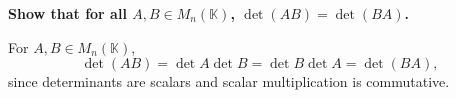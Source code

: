 \providecommand{\rank}{\operatorname{r}}
\providecommand{\RR}{\mathbb R}
\providecommand{\CC}{\mathbb C}
\providecommand{\KK}{\mathbb K}

\setcounter{enumi}{51}
\item {\bfseries\boldmath
Show that for all $A,B\in M_n(\KK)$, $\det(AB)=\det(BA)$.
}

\begin{answer}
For $A,B\in M_n(\KK)$,
\[
 \det(AB)=\det A\det B=\det B\det A=\det(BA),
\]
since determinants are scalars and scalar multiplication is commutative.
\end{answer}

